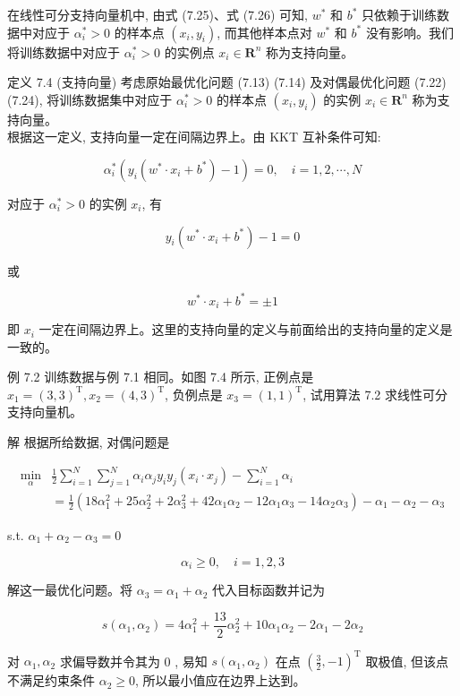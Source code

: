 \documentclass[10pt]{article}
\begin{document}
在线性可分支持向量机中, 由式 (7.25)、式 (7.26) 可知, $w^{*}$ 和 $b^{*}$ 只依赖于训练数据中对应于 $\alpha_{i}^{*}>0$ 的样本点 $\left(x_{i}, y_{i}\right)$, 而其他样本点对 $w^{*}$ 和 $b^{*}$ 没有影响。我们将训练数据中对应于 $\alpha_{i}^{*}>0$ 的实例点 $x_{i} \in \boldsymbol{R}^{n}$ 称为支持向量。

定义 7.4 (支持向量) 考虑原始最优化问题 (7.13) (7.14) 及对偶最优化问题 (7.22) (7.24), 将训练数据集中对应于 $\alpha_{i}^{*}>0$ 的样本点 $\left(x_{i}, y_{i}\right)$ 的实例 $x_{i} \in \boldsymbol{R}^{n}$ 称为支持向量。\\
根据这一定义, 支持向量一定在间隔边界上。由 KKT 互补条件可知:

$$
\alpha_{i}^{*}\left(y_{i}\left(w^{*} \cdot x_{i}+b^{*}\right)-1\right)=0, \quad i=1,2, \cdots, N
$$

对应于 $\alpha_{i}^{*}>0$ 的实例 $x_{i}$, 有

$$
y_{i}\left(w^{*} \cdot x_{i}+b^{*}\right)-1=0
$$

或

$$
w^{*} \cdot x_{i}+b^{*}= \pm 1
$$

即 $x_{i}$ 一定在间隔边界上。这里的支持向量的定义与前面给出的支持向量的定义是一致的。

例 7.2 训练数据与例 7.1 相同。如图 7.4 所示, 正例点是 $x_{1}=(3,3)^{\mathrm{T}}, x_{2}=(4,3)^{\mathrm{T}}$, 负例点是 $x_{3}=(1,1)^{\mathrm{T}}$, 试用算法 7.2 求线性可分支持向量机。

解 根据所给数据, 对偶问题是

$$
\begin{aligned}
\min _{\alpha} & \frac{1}{2} \sum_{i=1}^{N} \sum_{j=1}^{N} \alpha_{i} \alpha_{j} y_{i} y_{j}\left(x_{i} \cdot x_{j}\right)-\sum_{i=1}^{N} \alpha_{i} \\
& =\frac{1}{2}\left(18 \alpha_{1}^{2}+25 \alpha_{2}^{2}+2 \alpha_{3}^{2}+42 \alpha_{1} \alpha_{2}-12 \alpha_{1} \alpha_{3}-14 \alpha_{2} \alpha_{3}\right)-\alpha_{1}-\alpha_{2}-\alpha_{3}
\end{aligned}
$$

s.t. $\alpha_{1}+\alpha_{2}-\alpha_{3}=0$

$$
\alpha_{i} \geqslant 0, \quad i=1,2,3
$$

解这一最优化问题。将 $\alpha_{3}=\alpha_{1}+\alpha_{2}$ 代入目标函数并记为

$$
s\left(\alpha_{1}, \alpha_{2}\right)=4 \alpha_{1}^{2}+\frac{13}{2} \alpha_{2}^{2}+10 \alpha_{1} \alpha_{2}-2 \alpha_{1}-2 \alpha_{2}
$$

对 $\alpha_{1}, \alpha_{2}$ 求偏导数并令其为 0 , 易知 $s\left(\alpha_{1}, \alpha_{2}\right)$ 在点 $\left(\frac{3}{2},-1\right)^{\mathrm{T}}$ 取极值, 但该点不满足约束条件 $\alpha_{2} \geqslant 0$, 所以最小值应在边界上达到。
\end{document}

